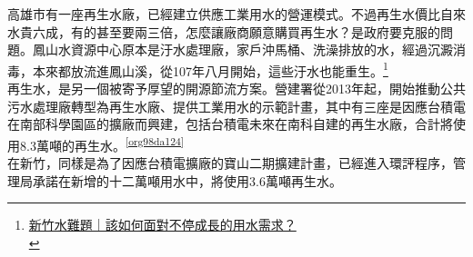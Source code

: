 \documentclass[a4paper,12pt]{article}
\begin{document}
高雄市有一座再生水廠，已經建立供應工業用水的營運模式。不過再生水價比自來水貴六成，有的甚至要兩三倍，怎麼讓廠商願意購買再生水？是政府要克服的問題。鳳山水資源中心原本是汙水處理廠，家戶沖馬桶、洗澡排放的水，經過沉澱消毒，本來都放流進鳳山溪，從107年八月開始，這些汙水也能重生。\footnote{\href{https://ourisland.pts.org.tw/content/7429}{新竹水難題｜該如何面對不停成長的用水需求？}\\}\\

再生水，是另一個被寄予厚望的開源節流方案。營建署從2013年起，開始推動公共污水處理廠轉型為再生水廠、提供工業用水的示範計畫，其中有三座是因應台積電在南部科學園區的擴廠而興建，包括台積電未來在南科自建的再生水廠，合計將使用8.3萬噸的再生水。\textsuperscript{\ref{org98da124}}\\

在新竹，同樣是為了因應台積電擴廠的寶山二期擴建計畫，已經進入環評程序，管理局承諾在新增的十二萬噸用水中，將使用3.6萬噸再生水。\\
\end{document}
